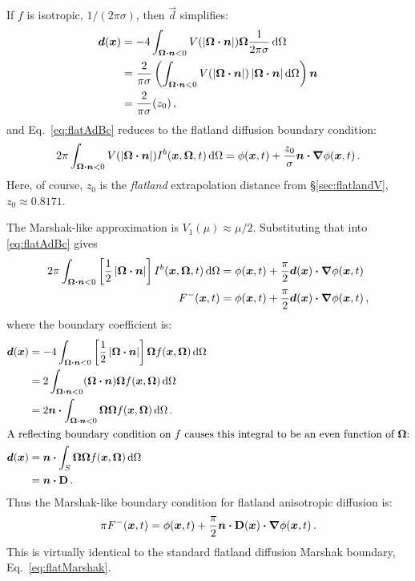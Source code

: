 If $f$ is isotropic, $1/(2\pi\sigma)$, then $\vec{d}$ simplifies:
\begin{align*}
  \bm{d}(\bm{x}) &= -4\int_{\bm{\Omega}\bm{\cdot}\bm{n} < 0}
  V(\left| \bm{\Omega}\bm{\cdot}\bm{n} \right|)
  \bm{\Omega} \frac{1}{2\pi\sigma} \mathop{}\!\mathrm{d}\Omega
\\
&= \frac{2}{\pi\sigma} \left( \int_{\bm{\Omega}\bm{\cdot}\bm{n} < 0}
  V(\left| \bm{\Omega}\bm{\cdot}\bm{n} \right|)
  \left| \bm{\Omega}\bm{\cdot}\bm{n} \right|\mathop{}\!\mathrm{d}\Omega\right) \bm{n}
\\
&= \frac{2}{\pi\sigma} (z_0) \,,
\end{align*}
and Eq.~\eqref{eq:flatAdBc} reduces to the flatland diffusion boundary
condition:
\begin{equation*}
2\pi \int_{\bm{\Omega}\bm{\cdot}\bm{n} < 0} V( \left| \bm{\Omega}\bm{\cdot}\bm{n} \right|)
I^b(\bm{x}, \bm{\Omega},t) \mathop{}\!\mathrm{d}\Omega
=
\phi(\bm{x},t)
+ \frac{z_0}{\sigma} \bm{n} \bm{\cdot} \bm{\nabla} \phi(\bm{x},t)\,.
\end{equation*}
Here, of course, $z_0$ is the \emph{flatland} extrapolation distance from
\S\ref{sec:flatlandV}, $z_0\approx 0.8171$.

The Marshak-like approximation is $V_1(\mu) \approx \mu/2$. Substituting that
into \eqref{eq:flatAdBc} gives
\begin{align*}
  2\pi \int_{\bm{\Omega}\bm{\cdot}\bm{n} < 0} \left[
    \frac{1}{2} \left| \bm{\Omega}\bm{\cdot}\bm{n} \right| \right]
I^b(\bm{x}, \bm{\Omega},t) \mathop{}\!\mathrm{d}\Omega
&=
\phi(\bm{x},t)
+ \frac{\pi}{2} \bm{d}(\bm{x}) \bm{\cdot} \bm{\nabla} \phi(\bm{x},t)
\\
F^-(\bm{x},t) 
&=
\phi(\bm{x},t)
+ \frac{\pi}{2} \bm{d}(\bm{x}) \bm{\cdot} \bm{\nabla} \phi(\bm{x},t) \,,
\end{align*}
where the boundary coefficient is:
\begin{align*}
  \bm{d}(\bm{x}) &= -4\int_{\bm{\Omega}\bm{\cdot}\bm{n} < 0}
  \left[ \frac{1}{2} \left| \bm{\Omega}\bm{\cdot}\bm{n} \right| \right]
  \bm{\Omega} f(\bm{x},\bm{\Omega}) \mathop{}\!\mathrm{d}\Omega
  \\
  &= 2 \int_{\bm{\Omega}\bm{\cdot}\bm{n} < 0} (\bm{\Omega}\bm{\cdot}\bm{n})
  \bm{\Omega} f(\bm{x},\bm{\Omega}) \mathop{}\!\mathrm{d}\Omega
  \\
  &=2 \bm{n} \bm{\cdot} \int_{\bm{\Omega}\bm{\cdot}\bm{n} < 0} \bm{\Omega}
  \bm{\Omega} f(\bm{x},\bm{\Omega}) \mathop{}\!\mathrm{d}\Omega \,.
  \\ 
  \intertext{A reflecting boundary condition on $f$ causes this integral to
    be an even function of $\bm{\Omega}$:}
  \bm{d}(\bm{x})
  &= \bm{n} \bm{\cdot} \int_{S}\bm{\Omega} \bm{\Omega}
  f(\bm{x},\bm{\Omega}) \mathop{}\!\mathrm{d}\Omega
  \\
  &= \bm{n} \bm{\cdot} \mathbf{D} \,.
\end{align*}
Thus the Marshak-like boundary condition for flatland anisotropic diffusion is:
\begin{equation}\label{eq:flatMarshakAdBc}
\pi F^-(\bm{x},t) 
=
\phi(\bm{x},t)
+ \frac{\pi}{2}\bm{n} \bm{\cdot} \mathbf{D}(\bm{x}) \bm{\cdot} \bm{\nabla} \phi(\bm{x},t) \,.
\end{equation}
This is virtually identical to the standard flatland diffusion Marshak boundary,
Eq.~\eqref{eq:flatMarshak}.

